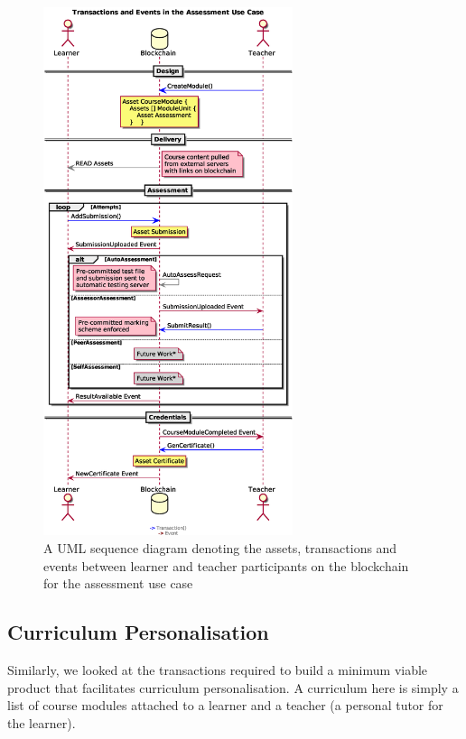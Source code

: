 \begin{figure}[!ht] 
    \centering    
    \includegraphics[width=0.65\textwidth]{assessmentloop}
    \caption[Assessment Use Case]
        {A UML sequence diagram denoting the assets, transactions and events between 
        learner and teacher participants on the blockchain for the assessment use case} 
    \label{fig:assessmentloop}
\end{figure}

\subsection{Curriculum Personalisation}

Similarly, we looked at the transactions required to build a minimum viable product 
that facilitates curriculum personalisation. A curriculum here is simply a list of course 
modules attached to a learner and a teacher (a personal tutor for the learner).

